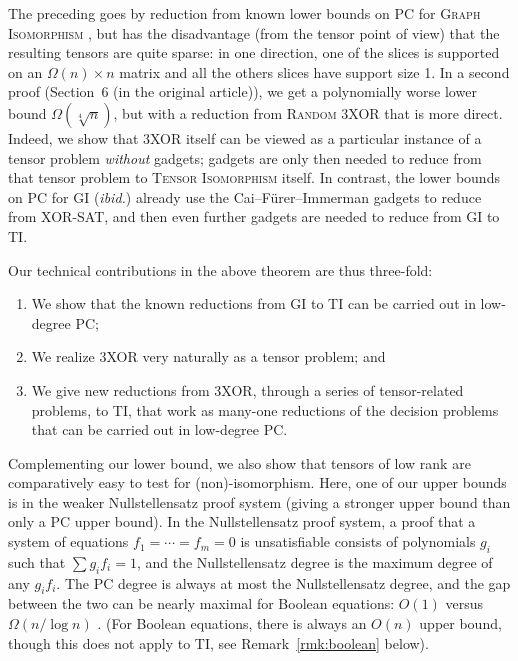 The preceding goes by reduction from known lower bounds on PC for \textsc{Graph Isomorphism} \cite{BerkholzG15, BerkholzG16}, but has the disadvantage (from the tensor point of view) that the resulting tensors are quite sparse: in one direction, one of the slices is supported on an $\Omega(n) \times n$ matrix and all the others slices have support size 1. In a second proof (Section~6 (in the original article)), we get a polynomially worse lower bound $\Omega(\sqrt[4]{n})$, but with a reduction from \textsc{Random 3XOR} that is more direct. Indeed, we show that 3XOR itself can be viewed as a particular instance of a tensor problem \emph{without} gadgets; gadgets are only then needed to reduce from that tensor problem to \textsc{Tensor Isomorphism} itself. In contrast, the lower bounds on PC for \textsc{GI} (\emph{ibid.}) already use the Cai--F\"{u}rer--Immerman gadgets \cite{CFI} to reduce from XOR-SAT, and then even further gadgets are needed to reduce from \textsc{GI} to \textsc{TI}. 

Our technical contributions in the above theorem are thus three-fold: 
\begin{enumerate}
\item We show that the known reductions from \textsc{GI} to \textsc{TI} can be carried out in low-degree PC; 
\item We realize 3XOR very naturally as a tensor problem; and 
\item We give new reductions from 3XOR, through a series of tensor-related problems, to \textsc{TI}, that work as many-one reductions of the decision problems that can be carried out in low-degree PC.
\end{enumerate}

Complementing our lower bound, we also show that tensors of low rank are comparatively easy to test for (non)-isomorphism. Here, one of our upper bounds is in the weaker Nullstellensatz proof system (giving a stronger upper bound than only a PC upper bound). In the Nullstellensatz proof system, a proof that a system of equations $f_1 = \dotsb = f_m = 0$ is unsatisfiable consists of polynomials $g_i$ such that $\sum g_i f_i = 1$, and the Nullstellensatz degree is the maximum degree of any $g_i f_i$. The PC degree is always at most the Nullstellensatz degree, and the gap between the two can be nearly maximal for Boolean equations: $O(1)$ versus $\Omega(n / \log n)$ \cite{BCIP}. (For Boolean equations, there is always an $O(n)$ upper bound, though this does not apply to \textsc{TI}, see Remark~\ref{rmk:boolean} below).

